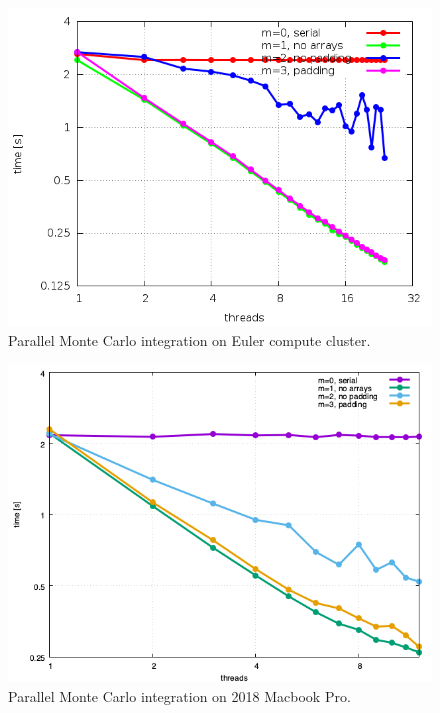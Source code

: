 \documentclass[11pt,a4paper]{article}
\begin{document}
\begin{figure}[ht]
\begin{center}
\includegraphics[scale=0.5]{results.png} 
\end{center}
\caption{Parallel Monte Carlo integration on Euler compute cluster.}
\label{fig1}
\end{figure}

\begin{figure}[ht]
\begin{center}
\includegraphics[scale=0.5]{results_mbp.png} 
\end{center}
\caption{Parallel Monte Carlo integration on 2018 Macbook Pro.}
\label{fig2}
\end{figure}
\end{document}
